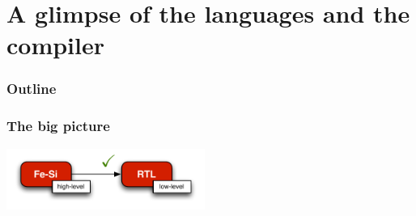 \documentclass[9pt]{beamer}
\begin{document}
\section{A glimpse of the languages and the compiler}
\begin{frame}
  \frametitle{Outline}       
  \tableofcontents[currentsection]  
\end{frame}

    
\begin{frame}
  \frametitle{The big picture}
  \begin{center}
    \includegraphics[height= 2cm ]{figs/compilation.pdf}
  \end{center}
\end{frame}
\end{document}

